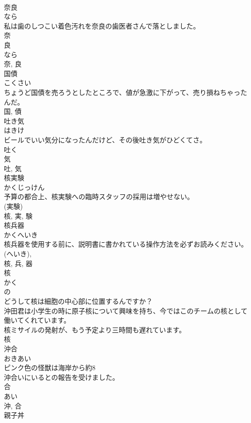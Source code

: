 \documentclass[8pt]{extreport}
\begin{document}
\begin{CJK}{UTF8}{min}
\\	奈良	
\\	なら	
\\	私は歯のしつこい着色汚れを奈良の歯医者さんで落としました。	
\\	奈 
\\	良 
\\	なら 
\\	奈, 良	
\\	国債	
\\	こくさい	
\\	ちょうど国債を売ろうとしたところで、値が急激に下がって、売り損ねちゃったんだ。	
\\	国, 債	
\\	吐き気	
\\	はきけ	
\\	ビールでいい気分になったんだけど、その後吐き気がひどくてさ。	
\\	吐く 
\\	気 
\\	吐, 気	
\\	核実験	
\\	かくじっけん	
\\	予算の都合上、核実験への臨時スタッフの採用は増やせない。	
\\	(実験) 
\\	核, 実, 験	
\\	核兵器	
\\	かくへいき	
\\	核兵器を使用する前に、説明書に書かれている操作方法を必ずお読みください。	
\\	(へいき), 
\\	核, 兵, 器	
\\	核	
\\	かく	
\\	の 
\\	どうして核は細胞の中心部に位置するんですか？	
\\	沖田君は小学生の時に原子核について興味を持ち、今ではこのチームの核として働いてくれています。	
\\	核ミサイルの発射が、もう予定より三時間も遅れています。	
\\	核	
\\	沖合	
\\	おきあい	
\\	ピンク色の怪獣は海岸から約8
\\	沖合いにいるとの報告を受けました。	
\\	合 
\\	あい 
\\	沖, 合	
\\	親子丼	

\end{CJK}
\end{document}
